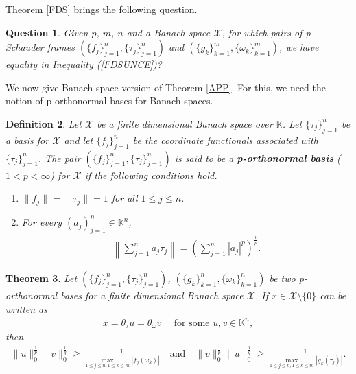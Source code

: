 \documentclass{amsart}
\newtheorem{theorem}{Theorem}[section]
\newtheorem{definition}[theorem]{Definition}
\newtheorem{question}[theorem]{Question}
\begin{document}
Theorem  \ref{FDS}  brings the following question.
\begin{question}
	Given $p$, $m$, $n$ and a Banach space $\mathcal{X}$, for which pairs of p-Schauder frames $(\{f_j\}_{j=1}^n, \{\tau_j\}_{j=1}^n)$ and $(\{g_k\}_{k=1}^m, \{\omega_k\}_{k=1}^m)$, we have equality in Inequality (\ref{FDSUNCE})?
\end{question}
We now give Banach space version of Theorem \ref{APP}. For this, we need the notion of p-orthonormal bases for Banach spaces. 
\begin{definition} \cite{KRISHNA} \label{PONB}
	Let $\mathcal{X}$  be a  finite dimensional Banach space over $\mathbb{K}$.   Let $\{\tau_j\}_{j=1}^n$ be a basis for   $\mathcal{X}$ and 	let $\{f_j\}_{j=1}^n$ be the coordinate functionals associated with $\{\tau_j\}_{j=1}^n$. The pair $(\{f_j\}_{j=1}^n, \{\tau_j\}_{j=1}^n)$ is said to be a \textbf{p-orthonormal basis} ($1<p <\infty$) for $\mathcal{X}$ if  the following conditions hold.
	\begin{enumerate}[\upshape(i)]
		\item $\|f_j\|=\|\tau_j\|=1$ for all $1\leq j\leq n$.
		\item For every $(a_j)_{j=1}^n \in \mathbb{K}^n$, 
		\begin{align*}
			\left\|\sum_{j=1}^na_j\tau_j \right\|=\left(\sum_{j=1}^n|a_j|^p\right)^\frac{1}{p}.
		\end{align*}
	\end{enumerate}
\end{definition}
\begin{theorem}
	Let $(\{f_j\}_{j=1}^n, \{\tau_j\}_{j=1}^n)$,  $(\{g_k\}_{k=1}^n, \{\omega_k\}_{k=1}^n)$ be two p-orthonormal  bases for a  finite dimensional Banach space $\mathcal{X}$. If $x \in \mathcal{X}\setminus\{0\}$ can be written as 
\begin{align*}
	x=\theta_\tau u=\theta_\omega v \quad \text{ for some } u, v \in \mathbb{K}^n, 
\end{align*}
then 
\begin{align*}
		\|u\|_0^\frac{1}{p}\|v\|_0^\frac{1}{q} \geq 	\frac{1}{\displaystyle\max_{1\leq j\leq n, 1\leq k\leq m}|f_j(\omega_k)|}\quad \text{and} \quad \|v\|_0^\frac{1}{p}\|u\|_0^\frac{1}{q}\geq \frac{1}{\displaystyle\max_{1\leq j\leq n, 1\leq k\leq m}|g_k(\tau_j)|}.
\end{align*}
\end{theorem}
\end{document}
